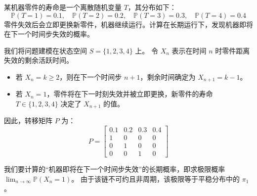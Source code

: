 \begin{questions}

\question 某机器零件的寿命是一个离散随机变量 $T$，其分布如下：
\[ \mathbb{P}(T = 1) = 0.1, \quad \mathbb{P}(T = 2) = 0.2, \quad \mathbb{P}(T = 3) = 0.3, \quad \mathbb{P}(T = 4) = 0.4 \]
零件失效后会立即更换新零件，机器继续运行。计算在长期运行下，发现机器即将在下一个时间步失效的概率。

\begin{solution}
我们将问题建模在状态空间 $S = \{1, 2, 3, 4\}$ 上。 令 $X_n$ 表示在时间 $n$ 时零件距离失效的剩余活跃时间。
\begin{itemize}
    \item 若 $X_n = k \geqslant 2$，则在下一个时间步 $n+1$，剩余时间确定为 $X_{n+1} = k-1$。
    \item 若 $X_n = 1$，零件将在下一时刻失效并被立即更换，新零件的寿命 $T \in \{1, 2, 3, 4\}$ 决定了 $X_{n+1}$ 的值。
\end{itemize}

因此，转移矩阵 $P$ 为：
\[
P = \begin{bmatrix} 
0.1 & 0.2 & 0.3 & 0.4 \\
1 & 0 & 0 & 0 \\
0 & 1 & 0 & 0 \\
0 & 0 & 1 & 0 
\end{bmatrix}
\]

我们要计算的“机器即将在下一个时间步失效”的长期概率，即求极限概率 $\lim_{n \to \infty} \mathbb{P}(X_n = 1)$。 由于该链不可约且非周期，该极限等于平稳分布中的 $\pi_1$。


\end{solution}
\end{questions}

